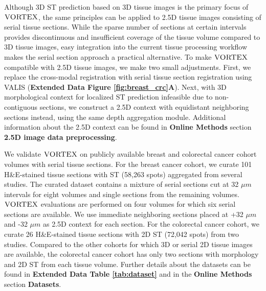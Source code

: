 
Although 3D ST prediction based on 3D tissue images is the primary focus of $\textsc{VORTEX}$, the same principles can be applied to 2.5D tissue images consisting of serial tissue sections. While the sparse number of sections at certain intervals provides discontinuous and insufficient coverage of the tissue volume compared to 3D tissue images, easy integration into the current tissue processing workflow makes the serial section approach a practical alternative. To make $\textsc{VORTEX}$ compatible with 2.5D tissue images, we make two small adjustments. First, we replace the cross-modal registration with serial tissue section registration using VALIS\cite{gatenbee2023virtual} (\textbf{Extended Data Figure \ref{fig:breast_crc}A}). Next, with 3D morphological context for localized ST prediction infeasible due to non-contiguous sections, we construct a 2.5D context with equidistant neighboring sections instead, using the same depth aggregation module. Additional information about the 2.5D context can be found in \textbf{Online Methods} section \textbf{2.5D image data preprocessing}.

We validate $\textsc{VORTEX}$ on publicly available breast and colorectal cancer cohort volumes with serial tissue sections.
For the breast cancer cohort, we curate 101 H\&E-stained tissue sections with ST (58,263 spots) aggregated from several studies\cite{andersson2021spatial,he2020integrating,staahl2016visualization}. The curated dataset contains a mixture of serial sections cut at 32 $\mu m$ intervals for eight volumes and single sections from the remaining volumes.  $\textsc{VORTEX}$ evaluations are performed on four volumes for which six serial sections are available\cite{andersson2021spatial}. We use immediate neighboring sections placed at +32 $\mu m$ and -32 $\mu m$ as 2.5D context for each section. For the colorectal cancer cohort, we curate 26 H\&E-stained tissue sections with 2D ST (72,042 spots) from two studies\cite{valdeolivas2024profiling,mirzazadeh2023spatially}. Compared to the other cohorts for which 3D or serial 2D tissue images are available, the colorectal cancer cohort has only two sections with morphology and 2D ST from each tissue volume. Further details about the datasets can be found in \textbf{Extended Data Table \ref{tab:dataset}} and in the \textbf{Online Methods} section \textbf{Datasets}.

